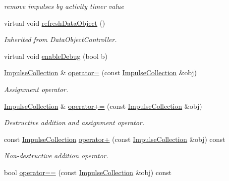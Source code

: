 \begin{DoxyCompactItemize}
\begin{DoxyCompactList}\small\item\em remove impulses by activity timer value \end{DoxyCompactList}\item 
virtual void \hyperlink{classcryomesh_1_1components_1_1ImpulseCollection_a892cc1028a9539de15668c39511adba3}{refresh\-Data\-Object} ()
\begin{DoxyCompactList}\small\item\em \-Inherited from \-Data\-Object\-Controller. \end{DoxyCompactList}\item 
virtual void \hyperlink{classcryomesh_1_1components_1_1ImpulseCollection_a3e6df4eb108bd6e5acc6abe4184912b8}{enable\-Debug} (bool b)
\item 
\hyperlink{classcryomesh_1_1components_1_1ImpulseCollection}{\-Impulse\-Collection} \& \hyperlink{classcryomesh_1_1components_1_1ImpulseCollection_af2f41361cb06d4e6a4028e7ad9ba4792}{operator=} (const \hyperlink{classcryomesh_1_1components_1_1ImpulseCollection}{\-Impulse\-Collection} \&obj)
\begin{DoxyCompactList}\small\item\em \-Assignment operator. \end{DoxyCompactList}\item 
\hyperlink{classcryomesh_1_1components_1_1ImpulseCollection}{\-Impulse\-Collection} \& \hyperlink{classcryomesh_1_1components_1_1ImpulseCollection_a92954d37e3ef80ead5205fc5b288925e}{operator+=} (const \hyperlink{classcryomesh_1_1components_1_1ImpulseCollection}{\-Impulse\-Collection} \&obj)
\begin{DoxyCompactList}\small\item\em \-Destructive addition and assignment operator. \end{DoxyCompactList}\item 
const \hyperlink{classcryomesh_1_1components_1_1ImpulseCollection}{\-Impulse\-Collection} \hyperlink{classcryomesh_1_1components_1_1ImpulseCollection_af3e0802e865b4de8c005d749953c0102}{operator+} (const \hyperlink{classcryomesh_1_1components_1_1ImpulseCollection}{\-Impulse\-Collection} \&obj) const 
\begin{DoxyCompactList}\small\item\em \-Non-\/destructive addition operator. \end{DoxyCompactList}\item 
bool \hyperlink{classcryomesh_1_1components_1_1ImpulseCollection_a68b0c4b2aa6b213d0e579cad2cb920af}{operator==} (const \hyperlink{classcryomesh_1_1components_1_1ImpulseCollection}{\-Impulse\-Collection} \&obj) const 

\end{DoxyCompactItemize}

